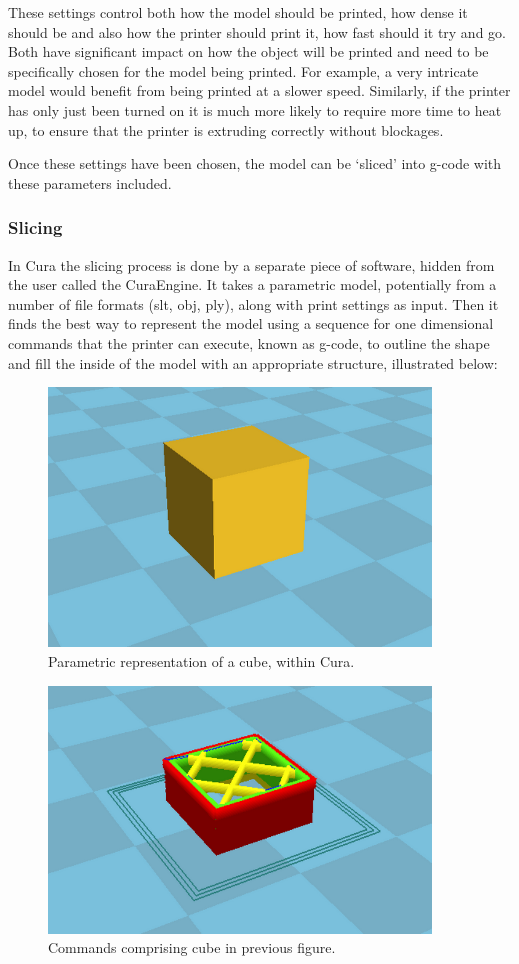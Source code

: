 \documentclass[pdftex, 11pt]{report} %
\begin{document}
These settings control both how the model should be printed, how dense it should be and also how the printer should print it, how fast should it try and go. Both have significant impact on how the object will be printed and need to be specifically chosen for the model being printed. For example, a very intricate model would benefit from being printed at a slower speed. Similarly, if the printer has only just been turned on it is much more likely to require more time to heat up, to ensure that the printer is extruding correctly without blockages.

Once these settings have been chosen, the model can be `sliced' into g-code with these parameters included.

\subsubsection{Slicing}
In Cura the slicing process is done by a separate piece of software, hidden from the user called the CuraEngine. It takes a parametric model, potentially from a number of file formats (slt, obj, ply), along with print settings as input. Then it finds the best way to represent the model using a sequence for one dimensional commands that the printer can execute, known as g-code, to outline the shape and fill the inside of the model with an appropriate structure, illustrated below:

\begin{figure}[H]
  \centering
  \includegraphics[width=4in]{james_cura_top_fig.png}
  \caption{Parametric representation of a cube, within Cura.}
  \label{figure:JCtop}
\end{figure}

\begin{figure}[H]
  \centering
  \includegraphics[width=4in]{james_cura_bottom_fig.png}
  \caption{Commands comprising cube in previous figure.}
  \label{figure:JCbottom}
\end{figure}
\end{document}
